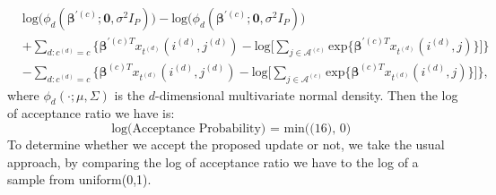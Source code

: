 \documentclass[a4paper]{article}
\begin{document}
\begin{equation}
\begin{aligned} 
&\mbox{log}\Big(\phi_d(\boldsymbol{\beta}^{\prime(c)};\mathbf{0}, \sigma^2I_P)\Big)-\mbox{log}\Big(\phi_d(\boldsymbol{\beta}^{\prime(c)};\mathbf{0}, \sigma^2I_P)\Big)\\&+\sum_{d:c^{(d)}=c}\Big\{\boldsymbol{\beta}^{\prime(c)T}x_{t^{(d)}}(i^{(d)}, j^{(d)})-\mbox{log}\big[\sum_{j\in \mathcal{A}^{(c)}}\mbox{exp}\{\boldsymbol{\beta}^{\prime(c)T}x_{t^{(d)}}(i^{(d)}, j)\}\big]\Big\}\\&-\sum_{d:c^{(d)}=c} \Big\{\boldsymbol{\beta}^{(c)T}x_{t^{(d)}}(i^{(d)}, j^{(d)})-\mbox{log}\big[\sum_{j\in \mathcal{A}^{(c)}}\mbox{exp}\{\boldsymbol{\beta}^{(c)T}x_{t^{(d)}}(i^{(d)}, j)\}\big]\Big\},
\end{aligned}
\end{equation}
where $\phi_d(\cdot;\mu, \Sigma)$ is the $d$-dimensional multivariate normal density.
Then the log of acceptance ratio we have is:
\begin{equation}
\mbox{log(Acceptance Probability) = min((16), 0) }
\end{equation}
To determine whether we accept the proposed update or not, we take the usual approach, by comparing the log of acceptance ratio we have to the log of a sample from uniform(0,1).
\end{document}
